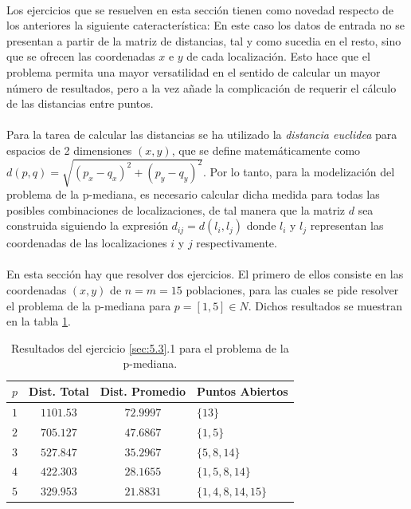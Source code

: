 \documentclass[spanish]{article}
\begin{document}
			\paragraph{}
			Los ejercicios que se resuelven en esta sección tienen como novedad respecto de los anteriores la siguiente cateracterística: En este caso los datos de entrada no se presentan a partir de la matriz de distancias, tal y como sucedia en el resto, sino que se ofrecen las coordenadas $x$ e $y$ de cada localización. Esto hace que el problema permita una mayor versatilidad en el sentido de calcular un mayor número de resultados, pero a la vez añade la complicación de requerir el cálculo de las distancias entre puntos.

			\paragraph{}
			Para la tarea de calcular las distancias se ha utilizado la \emph{distancia euclidea} para espacios de 2 dimensiones $(x,y)$, que se define matemáticamente como $d(p, q) = \sqrt{(p_x - q_x)^2 + (p_y - q_y)^2}$. Por lo tanto, para la modelización del problema de la p-mediana, es necesario calcular dicha medida para todas las posibles combinaciones de localizaciones, de tal manera que la matriz $d$ sea construida siguiendo la expresión $d_{ij} = d(l_i, l_j)$ donde $l_i$ y $l_j$ representan las coordenadas de las localizaciones $i$ y $j$ respectivamente.


			\paragraph{}
			En esta sección hay que resolver dos ejercicios. El primero de ellos consiste en las coordenadas $(x,y)$ de $n = m = 15$ poblaciones, para las cuales se pide resolver el problema de la p-mediana para $p = [1,5] \in N$. Dichos resultados se muestran en la tabla \ref{table:sol-5.3.1}.


			\begin{table}[h]
				\begin{center}
					\begin{tabular}{|c || c || c || l | }
						\hline
						$p$		& Dist. Total 	& Dist. Promedio	& Puntos Abiertos	 \\ \hline \hline
						$1$ 	& $1101.53$ 		& $72.9997$				& $\{13\}$ \\ \hline
						$2$ 	& $705.127$ 		& $47.6867$				& $\{1,5\}$ \\ \hline
						$3$ 	& $527.847$ 		& $35.2967$				& $\{5,8,14\}$ \\ \hline
						$4$ 	& $422.303$ 		& $28.1655$				& $\{1,5,8,14\}$ \\ \hline
						$5$ 	& $329.953$ 		& $21.8831$				& $\{1,4,8,14,15\}$ \\
						\hline
					\end{tabular}
				\end{center}
				\caption{Resultados del ejercicio \ref{sec:5.3}.1 para el problema de la p-mediana.}
				\label{table:sol-5.3.1}
			\end{table}
\end{document}
